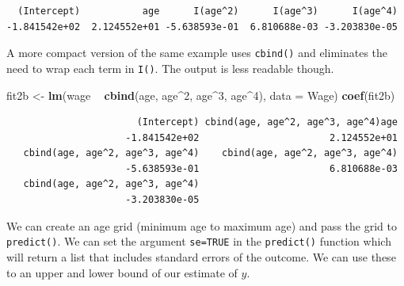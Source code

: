 \documentclass[]{article}
\newenvironment{Shaded}{\begin{snugshade}}{\end{snugshade}}
\newcommand{\CommentTok}[1]{\textcolor[rgb]{0.56,0.35,0.01}{\textit{#1}}}
\newcommand{\DataTypeTok}[1]{\textcolor[rgb]{0.13,0.29,0.53}{#1}}
\newcommand{\DecValTok}[1]{\textcolor[rgb]{0.00,0.00,0.81}{#1}}
\newcommand{\KeywordTok}[1]{\textcolor[rgb]{0.13,0.29,0.53}{\textbf{#1}}}
\newcommand{\NormalTok}[1]{#1}
\newcommand{\OperatorTok}[1]{\textcolor[rgb]{0.81,0.36,0.00}{\textbf{#1}}}
\newcommand{\OtherTok}[1]{\textcolor[rgb]{0.56,0.35,0.01}{#1}}
\newcommand{\StringTok}[1]{\textcolor[rgb]{0.31,0.60,0.02}{#1}}
\begin{document}
\begin{verbatim}
  (Intercept)           age      I(age^2)      I(age^3)      I(age^4) 
-1.841542e+02  2.124552e+01 -5.638593e-01  6.810688e-03 -3.203830e-05 
\end{verbatim}

A more compact version of the same example uses \texttt{cbind()} and eliminates the need to wrap each term in \texttt{I()}. The output is less readable though.

\begin{Shaded}
\begin{Highlighting}[]
\NormalTok{fit2b <-}\StringTok{ }\KeywordTok{lm}\NormalTok{(wage }\OperatorTok{~}\StringTok{ }\KeywordTok{cbind}\NormalTok{(age, age}\OperatorTok{^}\DecValTok{2}\NormalTok{, age}\OperatorTok{^}\DecValTok{3}\NormalTok{, age}\OperatorTok{^}\DecValTok{4}\NormalTok{), }\DataTypeTok{data =}\NormalTok{ Wage)}
\KeywordTok{coef}\NormalTok{(fit2b)}
\end{Highlighting}
\end{Shaded}

\begin{verbatim}
                       (Intercept) cbind(age, age^2, age^3, age^4)age 
                     -1.841542e+02                       2.124552e+01 
   cbind(age, age^2, age^3, age^4)    cbind(age, age^2, age^3, age^4) 
                     -5.638593e-01                       6.810688e-03 
   cbind(age, age^2, age^3, age^4) 
                     -3.203830e-05 
\end{verbatim}

We can create an age grid (minimum age to maximum age) and pass the grid to \texttt{predict()}. We can set the argument \texttt{se=TRUE} in the \texttt{predict()} function which will return a list that includes standard errors of the outcome. We can use these to an upper and lower bound of our estimate of \(y\).

\begin{Shaded}
\end{Shaded}
\end{document}
